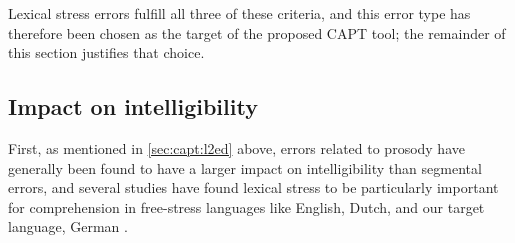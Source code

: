 	Lexical stress errors fulfill all three of these criteria, and this error type has therefore been chosen as the target of the proposed CAPT tool; the remainder of this section justifies that choice. 
%	
%	
%
%	 
%
%	
%
		\subsection{Impact on intelligibility}
		\label{sec:targeting:intelligibility}

	First, as mentioned in \cref{sec:capt:l2ed} above, errors related to prosody have generally been found to have a larger impact on intelligibility than segmental errors, and several studies have found lexical stress to be particularly important for comprehension in free-stress languages like English, Dutch, and our target language, German \citep{Hirschfeld1994,Cutler2005}.
%

